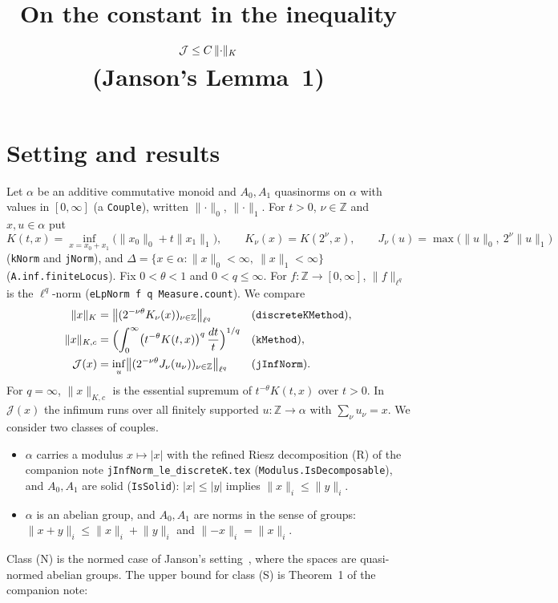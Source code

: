 \documentclass[11pt]{article}
\title{On the constant in the inequality \(\cJ \le C\,\norm{\cdot}{K}\)\\
\large (Janson's Lemma~1)}
\date{}
\theoremstyle{remark}
\newcommand{\abs}[1]{\lvert #1\rvert}
\newcommand{\norm}[2]{\lVert #1\rVert_{#2}}
\newcommand{\cJ}{\mathcal J}
\newcommand{\Z}{\mathbb Z}
\begin{document}
\maketitle

\section{Setting and results}

Let \(\alpha\) be an additive commutative monoid and \(A_0, A_1\) quasinorms on \(\alpha\) with
values in \([0,\infty]\) (a \texttt{Couple}), written \(\norm{\cdot}{0}\), \(\norm{\cdot}{1}\).
For \(t > 0\), \(\nu \in \Z\) and \(x, u \in \alpha\) put
\[
  K(t,x) = \inf_{x = x_0 + x_1}\bigl(\norm{x_0}{0} + t\norm{x_1}{1}\bigr),\qquad
  K_\nu(x) = K(2^\nu, x),\qquad
  J_\nu(u) = \max\bigl(\norm{u}{0},\ 2^\nu\norm{u}{1}\bigr)
\]
(\texttt{kNorm} and \texttt{jNorm}), and
\(\Delta = \{x \in \alpha : \norm{x}{0} < \infty,\ \norm{x}{1} < \infty\}\)
(\texttt{A.inf.finiteLocus}). Fix \(0 < \theta < 1\) and \(0 < q \le \infty\). For
\(f\colon \Z \to [0,\infty]\), \(\norm{f}{\ell^q}\) is the \(\ell^q\)-norm
(\texttt{eLpNorm f q Measure.count}). We compare
\begin{align*}
  \norm{x}{K} &= \bigl\lVert (2^{-\nu\theta} K_\nu(x))_{\nu\in\Z} \bigr\rVert_{\ell^q}
    && (\texttt{discreteKMethod}),\\
  \norm{x}{K,c} &= \Bigl(\int_0^\infty \bigl(t^{-\theta} K(t,x)\bigr)^q\,\frac{dt}{t}\Bigr)^{1/q}
    && (\texttt{kMethod}),\\
  \cJ(x) &= \inf_u \bigl\lVert (2^{-\nu\theta} J_\nu(u_\nu))_{\nu\in\Z} \bigr\rVert_{\ell^q}
    && (\texttt{jInfNorm}).
\end{align*}
For \(q = \infty\), \(\norm{x}{K,c}\) is the essential supremum of \(t^{-\theta}K(t,x)\) over
\(t > 0\). In \(\cJ(x)\) the infimum runs over all finitely supported \(u\colon \Z \to \alpha\)
with \(\sum_\nu u_\nu = x\).
We consider two classes of couples.
\begin{itemize}
  \item[(S)] \(\alpha\) carries a modulus \(x \mapsto \abs{x}\) with the refined Riesz
    decomposition (R) of the companion note \texttt{jInfNorm\_le\_discreteK.tex}
    (\texttt{Modulus.IsDecomposable}), and \(A_0, A_1\) are solid (\texttt{IsSolid}):
    \(\abs{x} \le \abs{y}\) implies \(\norm{x}{i} \le \norm{y}{i}\).
  \item[(N)] \(\alpha\) is an abelian group, and \(A_0, A_1\) are norms in the sense of
    groups: \(\norm{x+y}{i} \le \norm{x}{i} + \norm{y}{i}\) and \(\norm{-x}{i} = \norm{x}{i}\).
\end{itemize}
Class (N) is the normed case of Janson's setting~\cite{Janson}, where the spaces are
quasi-normed abelian groups. The upper bound for class (S) is Theorem~1 of the companion note:
\end{document}
